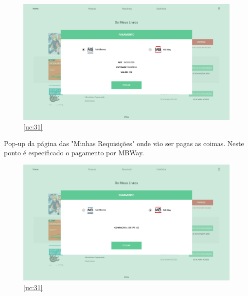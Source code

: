 \begin{figure}[H]
	\centering
	\includegraphics[width=1\linewidth]{../Mockups/PNGs/Pagamento de coimas Multibanco.png}  %
	\caption{\ref{uc:31}}
	\label{fig:chap230}
\end{figure}


\newpage

Pop-up da página das "Minhas Requisições" onde vão ser pagas as coimas. Neste ponto é especificado o pagamento por MBWay.


\begin{figure}[H]
	\centering
	\includegraphics[width=1\linewidth]{../Mockups/PNGs/Pagamento de coimas MBWay.png}  %
	\caption{\ref{uc:31}}
	\label{fig:chap230}
\end{figure}





